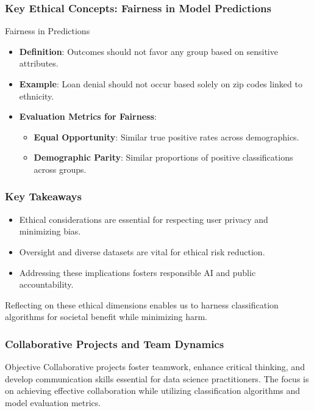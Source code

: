\documentclass[aspectratio=169]{beamer}
\begin{document}
\begin{frame}[fragile]
    \frametitle{Key Ethical Concepts: Fairness in Model Predictions}
    \begin{block}{Fairness in Predictions}
        \begin{itemize}
            \item \textbf{Definition}: Outcomes should not favor any group based on sensitive attributes.
            \item \textbf{Example}: Loan denial should not occur based solely on zip codes linked to ethnicity.
            \item \textbf{Evaluation Metrics for Fairness}:
                \begin{itemize}
                    \item \textbf{Equal Opportunity}: Similar true positive rates across demographics.
                    \item \textbf{Demographic Parity}: Similar proportions of positive classifications across groups.
                \end{itemize}
        \end{itemize}
    \end{block}
\end{frame}

\begin{frame}[fragile]
    \frametitle{Key Takeaways}
    \begin{itemize}
        \item Ethical considerations are essential for respecting user privacy and minimizing bias.
        \item Oversight and diverse datasets are vital for ethical risk reduction.
        \item Addressing these implications fosters responsible AI and public accountability.
    \end{itemize}
    Reflecting on these ethical dimensions enables us to harness classification algorithms for societal benefit while minimizing harm.
\end{frame}

\begin{frame}[fragile]
    \frametitle{Collaborative Projects and Team Dynamics}
    \begin{block}{Objective}
        Collaborative projects foster teamwork, enhance critical thinking, and develop communication skills essential for data science practitioners. The focus is on achieving effective collaboration while utilizing classification algorithms and model evaluation metrics.
    \end{block}
\end{frame}
\end{document}
